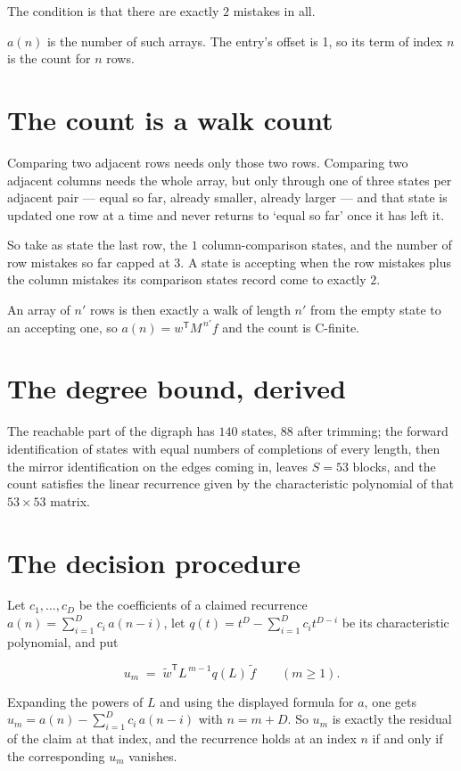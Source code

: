 \documentclass[11pt]{article}
\theoremstyle{definition}
\begin{document}
The condition is that there are exactly $2$ mistakes in all.

$a(n)$ is the number of such arrays. The entry's offset is 1, so its term of index $n$ is the count for $n$ rows.

\section{The count is a walk count}

Comparing two adjacent rows needs only those two rows. Comparing two adjacent columns needs the whole array, but only through one of three states per adjacent pair --- equal so far, already smaller, already larger --- and that state is updated one row at a time and never returns to `equal so far' once it has left it.

So take as state the last row, the $1$ column-comparison states, and the number of row mistakes so far capped at $3$. A state is accepting when the row mistakes plus the column mistakes its comparison states record come to exactly $2$.

An array of $n'$ rows is then exactly a walk of length $n'$ from the empty state to an accepting one, so $a(n) = w^{\mathsf T}M^{\,n'}f$ and the count is C-finite.

\section{The degree bound, derived}

The reachable part of the digraph has $140$ states, $88$ after trimming; the forward identification of states with equal numbers of completions of every length, then the mirror identification on the edges coming in, leaves $S = 53$ blocks, and the count satisfies the linear recurrence given by the characteristic polynomial of that $53\times53$ matrix.

\section{The decision procedure}

Let $c_1,\dots,c_D$ be the coefficients of a claimed recurrence $a(n) = \sum_{i=1}^{D} c_i\,a(n-i)$, let $q(t) = t^{D} - \sum_{i=1}^{D} c_i t^{D-i}$ be its characteristic polynomial, and put

\[u_m \;=\; \tilde w^{\mathsf T} L^{\,m-1} q(L)\,\tilde f \qquad (m \ge 1).\]

Expanding the powers of $L$ and using the displayed formula for $a$, one gets $u_m = a(n) - \sum_{i=1}^{D} c_i\,a(n-i)$ with $n = m + D$. So $u_m$ is exactly the residual of the claim at that index, and the recurrence holds at an index $n$ if and only if the corresponding $u_m$ vanishes.
\end{document}
